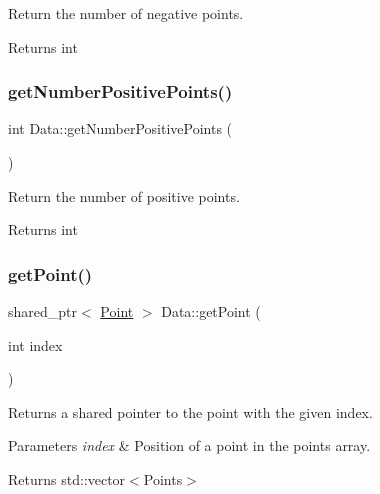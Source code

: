 Return the number of negative points. 

\begin{DoxyReturn}{Returns}
int 
\end{DoxyReturn}
\mbox{\label{class_data_a45a39ab2144bcdd0ac1aa67d7d08a6cc}} 
\subsubsection{\texorpdfstring{get\+Number\+Positive\+Points()}{getNumberPositivePoints()}}
{\footnotesize\ttfamily int Data\+::get\+Number\+Positive\+Points (\begin{DoxyParamCaption}{ }\end{DoxyParamCaption})}



Return the number of positive points. 

\begin{DoxyReturn}{Returns}
int 
\end{DoxyReturn}
\mbox{\label{class_data_abd978f3708d705e972dc458b6e3fe791}} 
\subsubsection{\texorpdfstring{get\+Point()}{getPoint()}}
{\footnotesize\ttfamily shared\+\_\+ptr$<$ \hyperlink{class_point}{Point} $>$ Data\+::get\+Point (\begin{DoxyParamCaption}\item[{int}]{index }\end{DoxyParamCaption})}



Returns a shared pointer to the point with the given index. 


\begin{DoxyParams}{Parameters}
{\em index} & Position of a point in the points array. \\
\hline
\end{DoxyParams}
\begin{DoxyReturn}{Returns}
std\+::vector$<$\+Points$>$ 
\end{DoxyReturn}
\mbox{\label{class_data_a9310e45321bca4335b8ab3031d343e16}} 
